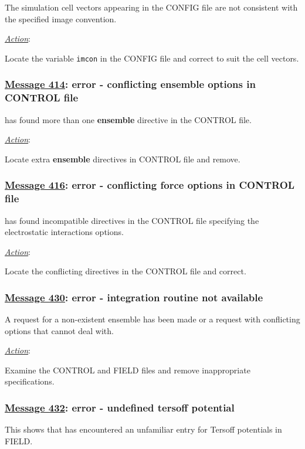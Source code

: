 The simulation cell vectors appearing in the CONFIG file are not
consistent with the specified image convention.

\noindent \underline{\em Action}:

Locate the variable {\tt imcon} in the CONFIG file and correct to
suit the cell vectors.

\subsubsection*{\underline{Message 414}: error - conflicting ensemble options in CONTROL file}

\D has found more than one {\bf ensemble} directive in the CONTROL
file.

\noindent \underline{\em Action}:

Locate extra {\bf ensemble} directives in CONTROL file and remove.

\subsubsection*{\underline{Message 416}: error - conflicting force options in CONTROL file}

\D has found incompatible directives in the CONTROL file
specifying the electrostatic interactions options.

\noindent \underline{\em Action}:

Locate the conflicting directives in the CONTROL file and correct.

\subsubsection*{\underline{Message 430}: error - integration routine not available}

A request for a non-existent ensemble has been
made or a request with conflicting options that \D cannot deal
with.

\noindent \underline{\em Action}:

Examine the CONTROL and FIELD files and remove inappropriate
specifications.

\subsubsection*{\underline{Message 432}: error -  undefined tersoff potential}

This shows that \D has encountered an unfamiliar entry for Tersoff
potentials in FIELD.

